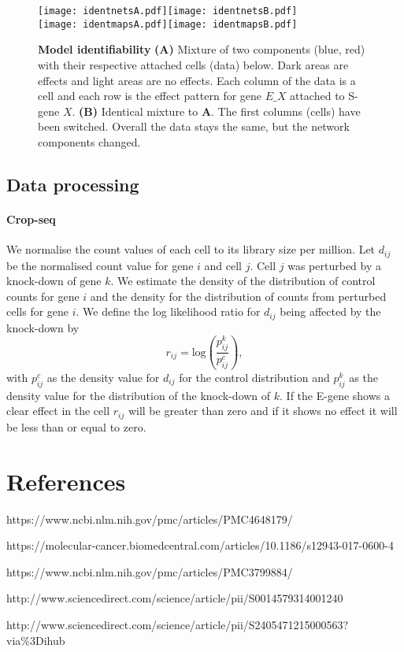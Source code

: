 \documentclass[12pt]{article}
\begin{document}
\begin{figure}
\begin{center}
\texttt{[image: identnetsA.pdf]}\hspace{2cm}\texttt{[image: identnetsB.pdf]}\\
\texttt{[image: identmapsA.pdf]}\hspace{2cm}\texttt{[image: identmapsB.pdf]}
\caption{\textbf{Model identifiability} \textbf{(A)} Mixture of two components (blue, red) with their respective attached cells (data) below. Dark areas are effects and light areas are no effects. Each column of the data is a cell and each row is the effect pattern for gene $E\_X$ attached to S-gene $X$. \textbf{(B)} Identical mixture to \textbf{A}. The first columns (cells) have been switched. Overall the data stays the same, but the network components changed.}\label{fig:ident}
\end{center}
\end{figure}

\subsection{Data processing}

\paragraph{Crop-seq}
We normalise the count values of each cell to its library size per million. Let $d_{ij}$ be the normalised count value for gene $i$ and cell $j$. Cell $j$  was perturbed by a knock-down of gene $k$. We estimate the density of the distribution of control counts for gene $i$ and the density for the distribution of counts from perturbed cells for gene $i$. We define the log likelihood ratio for $d_{ij}$ being affected by the knock-down by
\[r_{ij} = \mathrm{log} \left(\frac{p_{ij}^k}{p_{ij}^c}\right),\]
with $p_{ij}^c$ as the density value for $d_{ij}$ for the control distribution and $p_{ij}^k$ as the density value for the distribution of the knock-down of $k$. If the E-gene shows a clear effect in the cell $r_{ij}$ will be greater than zero and if it shows no effect it will be less than or equal to zero.

\section{References}
https://www.ncbi.nlm.nih.gov/pmc/articles/PMC4648179/

https://molecular-cancer.biomedcentral.com/articles/10.1186/s12943-017-0600-4

https://www.ncbi.nlm.nih.gov/pmc/articles/PMC3799884/

http://www.sciencedirect.com/science/article/pii/S0014579314001240

http://www.sciencedirect.com/science/article/pii/S2405471215000563?via\%3Dihub
\end{document}
